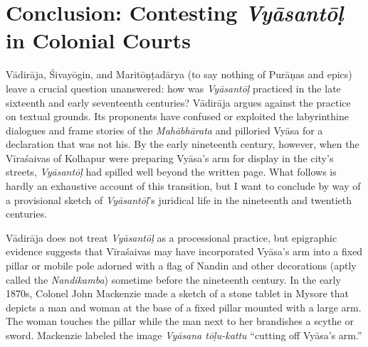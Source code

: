\section{Conclusion: Contesting \emph{Vyāsantōḷ} in Colonial Courts}
      Vādirāja, Śivayōgin, and Maritōṇṭadārya (to say nothing of Purāṇas and epics) leave a crucial question unanswered: how was \emph{Vyāsantōḷ} practiced in the late sixteenth and early seventeenth centuries? Vādirāja argues against the practice on textual grounds. Its proponents have confused or exploited the labyrinthine dialogues and frame stories of the \emph{Mahābhārata} and pilloried Vyāsa for a declaration that was not his. By the early nineteenth century, however, when the Vīraśaivas of Kolhapur were preparing Vyāsa’s arm for display in the city’s streets, \emph{Vyāsantōḷ} had spilled well beyond the written page. What follows is hardly an exhaustive account of this transition, but I want to conclude by way of a provisional sketch of \emph{Vyāsantōḷ}’s juridical life in the nineteenth and twentieth centuries.


Vādirāja does not treat \emph{Vyāsantōḷ} as a processional practice, but epigraphic evidence suggests that Vīraśaivas may have incorporated Vyāsa’s arm into a fixed pillar or mobile pole adorned with a flag of Nandin and other decorations (aptly called the \emph{{Nandikamba}}) sometime before the nineteenth century. In the early 1870s, Colonel John Mackenzie made a sketch of a stone tablet in Mysore that depicts a man and woman at the base of a fixed pillar mounted with a large arm. The woman touches the pillar while the man next to her brandishes a scythe or sword. Mackenzie labeled the image \emph{Vyāsana tōḷu-kattu}  \Dash  “cutting off Vyāsa’s arm.” 

